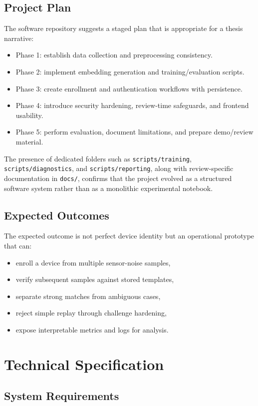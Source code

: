 \documentclass[12pt]{report}
\begin{document}
\section{Project Plan}
The software repository suggests a staged plan that is appropriate for a thesis narrative:
\begin{itemize}[leftmargin=1.2cm]
\item Phase 1: establish data collection and preprocessing consistency.
\item Phase 2: implement embedding generation and training/evaluation scripts.
\item Phase 3: create enrollment and authentication workflows with persistence.
\item Phase 4: introduce security hardening, review-time safeguards, and frontend usability.
\item Phase 5: perform evaluation, document limitations, and prepare demo/review material.
\end{itemize}

The presence of dedicated folders such as \texttt{scripts/training}, \texttt{scripts/diagnostics}, and \texttt{scripts/reporting}, along with review-specific documentation in \texttt{docs/}, confirms that the project evolved as a structured software system rather than as a monolithic experimental notebook.

\section{Expected Outcomes}
The expected outcome is not perfect device identity but an operational prototype that can:
\begin{itemize}[leftmargin=1.2cm]
\item enroll a device from multiple sensor-noise samples,
\item verify subsequent samples against stored templates,
\item separate strong matches from ambiguous cases,
\item reject simple replay through challenge hardening,
\item expose interpretable metrics and logs for analysis.
\end{itemize}

\chapter{Technical Specification}
\section{System Requirements}
\end{document}
